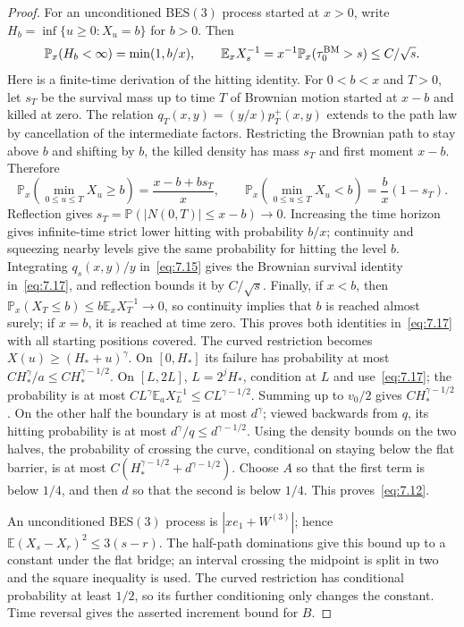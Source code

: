 \documentclass[11pt,a4paper]{article}
\numberwithin{equation}{section}
\theoremstyle{remark}
\begin{document}
\begin{proof}
For an unconditioned BES$(3)$ process started at $x>0$, write $H_b=\inf\{u\ge0:X_u=b\}$ for $b>0$. Then
\begin{equation}\label{eq:7.17}
\mathbb P_x(H_b<\infty)=\min(1,b/x),\qquad
\mathbb E_x X_s^{-1}
=x^{-1}\mathbb P_x(\tau_0^{\rm BM}>s)\le C/\sqrt s.
\end{equation}
Here is a finite-time derivation of the hitting identity. For $0<b<x$ and $T>0$, let $s_T$ be the survival mass up to time $T$ of Brownian motion started at $x-b$ and killed at zero. The relation $q_T(x,y)=(y/x)p_T^+(x,y)$ extends to the path law by cancellation of the intermediate factors. Restricting the Brownian path to stay above $b$ and shifting by $b$, the killed density has mass $s_T$ and first moment $x-b$. Therefore
\[
\mathbb P_x\!\left(\min_{0\le u\le T}X_u\ge b\right)
=\frac{x-b+b s_T}{x},\qquad
\mathbb P_x\!\left(\min_{0\le u\le T}X_u<b\right)
=\frac bx(1-s_T).
\]
Reflection gives $s_T=\mathbb P(|N(0,T)|\le x-b)\to0$. Increasing the time horizon gives infinite-time strict lower hitting with probability $b/x$; continuity and squeezing nearby levels give the same probability for hitting the level $b$. Integrating $q_s(x,y)/y$ in~\eqref{eq:7.15} gives the Brownian survival identity in~\eqref{eq:7.17}, and reflection bounds it by $C/\sqrt s$. Finally, if $x<b$, then $\mathbb P_x(X_T\le b)\le b\mathbb E_xX_T^{-1}\to0$, so continuity implies that $b$ is reached almost surely; if $x=b$, it is reached at time zero. This proves both identities in~\eqref{eq:7.17} with all starting positions covered.
The curved restriction becomes $X(u)\ge(H_*+u)^\gamma$.
On $[0,H_*]$ its failure has probability at most $CH_*^\gamma/a\le CH_*^{\gamma-1/2}$.
On $[L,2L]$, $L=2^jH_*$, condition at $L$ and use~\eqref{eq:7.17}; the probability is at most $CL^\gamma\mathbb E_aX_L^{-1}\le CL^{\gamma-1/2}$.
Summing up to $v_0/2$ gives $CH_*^{\gamma-1/2}$.
On the other half the boundary is at most $d^\gamma$; viewed backwards from $q$, its hitting probability is at most $d^\gamma/q\le d^{\gamma-1/2}$.
Using the density bounds on the two halves, the probability of crossing the curve, conditional on staying below the flat barrier, is at most
$C(H_*^{\gamma-1/2}+d^{\gamma-1/2})$.
Choose $A$ so that the first term is below $1/4$, and then $d$ so that the second is below $1/4$. This proves~\eqref{eq:7.12}.

An unconditioned BES$(3)$ process is $|x e_1+W^{(3)}|$; hence
$\mathbb E(X_s-X_r)^2\le3(s-r)$.
The half-path dominations give this bound up to a constant under the flat bridge; an interval crossing the midpoint is split in two and the square inequality is used. The curved restriction has conditional probability at least $1/2$, so its further conditioning only changes the constant. Time reversal gives the asserted increment bound for $B$.
\end{proof}
\end{document}
